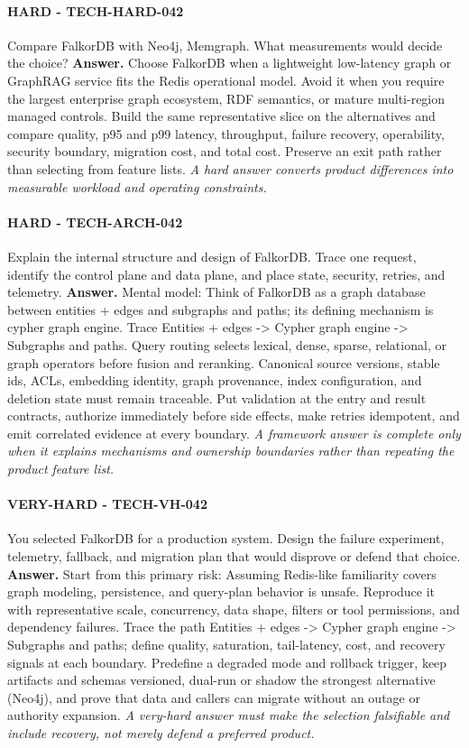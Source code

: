 \paragraph{HARD - TECH-HARD-042} Compare FalkorDB with Neo4j, Memgraph. What measurements would decide the choice?
\textbf{Answer.} Choose FalkorDB when a lightweight low-latency graph or GraphRAG service fits the Redis operational model. Avoid it when you require the largest enterprise graph ecosystem, RDF semantics, or mature multi-region managed controls. Build the same representative slice on the alternatives and compare quality, p95 and p99 latency, throughput, failure recovery, operability, security boundary, migration cost, and total cost. Preserve an exit path rather than selecting from feature lists.
\textit{A hard answer converts product differences into measurable workload and operating constraints.}
\paragraph{HARD - TECH-ARCH-042} Explain the internal structure and design of FalkorDB. Trace one request, identify the control plane and data plane, and place state, security, retries, and telemetry.
\textbf{Answer.} Mental model: Think of FalkorDB as a graph database between entities + edges and subgraphs and paths; its defining mechanism is cypher graph engine. Trace Entities + edges -> Cypher graph engine -> Subgraphs and paths. Query routing selects lexical, dense, sparse, relational, or graph operators before fusion and reranking. Canonical source versions, stable ids, ACLs, embedding identity, graph provenance, index configuration, and deletion state must remain traceable. Put validation at the entry and result contracts, authorize immediately before side effects, make retries idempotent, and emit correlated evidence at every boundary.
\textit{A framework answer is complete only when it explains mechanisms and ownership boundaries rather than repeating the product feature list.}
\paragraph{VERY-HARD - TECH-VH-042} You selected FalkorDB for a production system. Design the failure experiment, telemetry, fallback, and migration plan that would disprove or defend that choice.
\textbf{Answer.} Start from this primary risk: Assuming Redis-like familiarity covers graph modeling, persistence, and query-plan behavior is unsafe. Reproduce it with representative scale, concurrency, data shape, filters or tool permissions, and dependency failures. Trace the path Entities + edges -> Cypher graph engine -> Subgraphs and paths; define quality, saturation, tail-latency, cost, and recovery signals at each boundary. Predefine a degraded mode and rollback trigger, keep artifacts and schemas versioned, dual-run or shadow the strongest alternative (Neo4j), and prove that data and callers can migrate without an outage or authority expansion.
\textit{A very-hard answer must make the selection falsifiable and include recovery, not merely defend a preferred product.}
